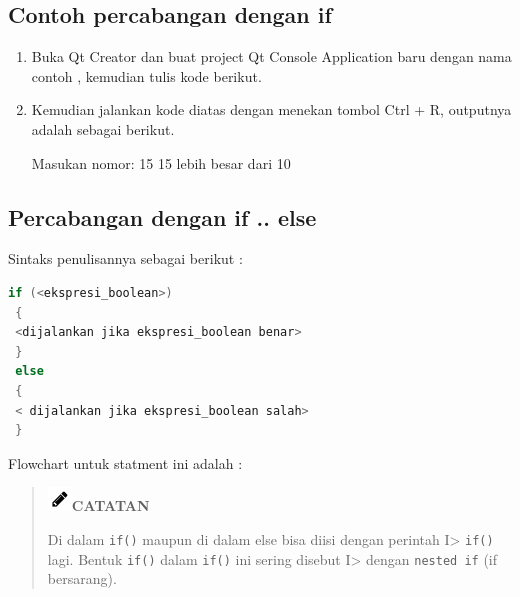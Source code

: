 \subsection*{Contoh percabangan dengan if}

\begin{enumerate}
	\item  Buka Qt Creator dan buat project Qt Console Application baru dengan
	nama contoh , kemudian tulis kode berikut.
	
	
	
	\item  Kemudian jalankan kode diatas dengan menekan tombol Ctrl + R, outputnya adalah sebagai berikut.
	
\begin{lcverbatim}
Masukan nomor: 15
15 lebih besar dari 10
\end{lcverbatim}
\end{enumerate}
\subsection{Percabangan dengan if .. else}\label{percabangan-dengan-if-..-else}

Sintaks penulisannya sebagai berikut :

\begin{lstlisting}[language=c++]
 if (<ekspresi_boolean>)
 {
 <dijalankan jika ekspresi_boolean benar>
 }
 else
 {
 < dijalankan jika ekspresi_boolean salah>
 }
\end{lstlisting}

Flowchart untuk statment ini adalah :

\begin{quotation}
\includegraphics{../manuscript/images/pencil.png}\textbf{CATATAN} 

Di
dalam \texttt{if()} maupun di dalam else bisa diisi dengan perintah
I\textgreater{} \texttt{if()} lagi. Bentuk \texttt{if()} dalam
\texttt{if()} ini sering disebut I\textgreater{} dengan
\texttt{nested\ if} (if bersarang).
\end{quotation}



